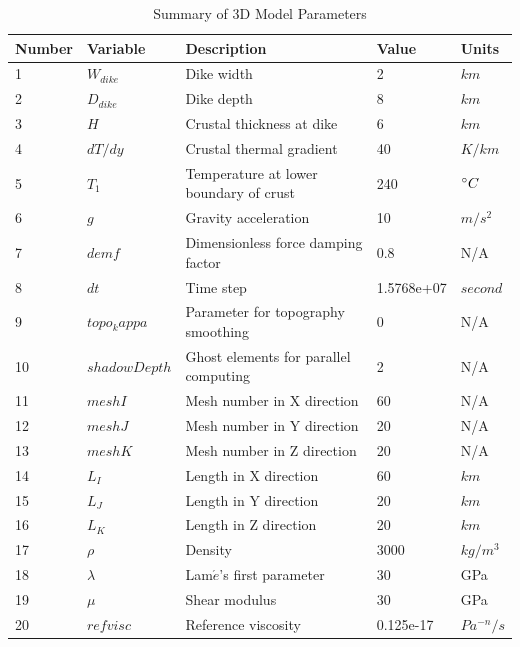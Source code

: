 \begin{table}[h]
\caption{Summary of 3D Model Parameters}
\centering
 \small
  \begin{tabular}[h]{l l p{6.8cm} l l}
\hline
\hline
Number & Variable & Description & Value & Units \\ 
\hline
1    &  $W_{dike}$    &   Dike width        & 2   &  $km$\\
\hline
2    &  $D_{dike}$    &   Dike depth        & 8   &  $km$\\
\hline
3    &  $H$    &   Crustal thickness at dike   & 6   &  $km$ \\
\hline
4    &  $dT/dy$    &   Crustal thermal gradient        & 40   &  $K/km$ \\
\hline
5    &  $T_{1}$    &   Temperature at lower boundary of crust    & 240   &  $\degree C$ \\
\hline
6    &  $g$    &   Gravity acceleration    & 10   &  $m/s^{2}$ \\
\hline
7    &  $demf$    &   Dimensionless force damping factor   & 0.8   &  N/A  \\
\hline
8    &  $dt$    &   Time step    & 1.5768e+07   &  $second$  \\
\hline
9    &  $topo_kappa$    &   Parameter for topography smoothing    & 0   &  N/A   \\
\hline
10   &  $shadowDepth$    &   Ghost elements for parallel computing   & 2   &  N/A   \\
\hline
11   &  $meshI$    &   Mesh number in X direction   & 60   &  N/A   \\
\hline
12   &  $meshJ$    &   Mesh number in Y direction      & 20   & N/A  \\
\hline
13   &  $meshK$    &   Mesh number in Z direction      & 20   & N/A  \\
\hline
14   &  $L_{I}$    &   Length in X direction      & 60   & $km$  \\
\hline
15   &  $L_{J}$    &   Length in Y direction      & 20   & $km$  \\
\hline
16   &  $L_{K}$    &   Length in Z direction      & 20   & $km$  \\
\hline
17   &  $\rho$    &    Density      & 3000   & $kg/m^{3}$  \\
\hline
18   &  $\lambda$    &    Lam$\acute{e}$'s first parameter    & 30   & GPa  \\
\hline
19   &  $\mu$    &    Shear modulus      & 30   & GPa  \\
\hline
20   &  $refvisc$    &    Reference viscosity      & 0.125e-17   & $Pa^{-n}/s$  \\

\end{tabular}
\end{table}
